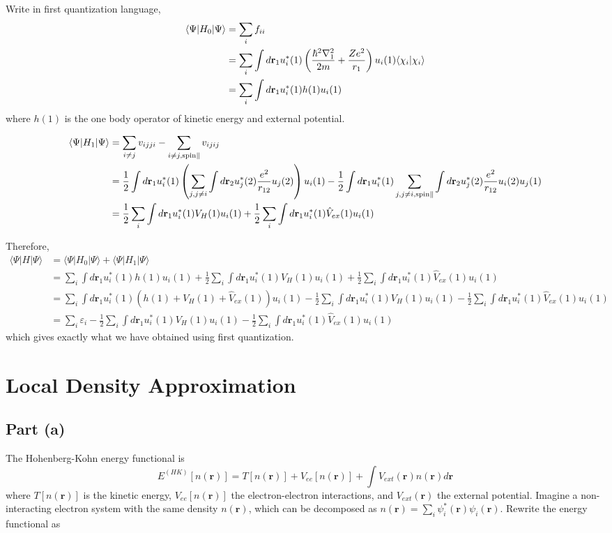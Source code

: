 \documentclass{article}
\begin{document}
Write in first quantization language,
\begin{align*}
\langle\Psi|H_0|\Psi\rangle&=\sum_if_{ii}\\
&=\sum_i\int d\mathbf{r}_1u_i^*(1)\left(\-\frac{\hbar^2\nabla_1^2}{2m}+\frac{Ze^2}{r_1}\right)u_i(1)\langle\chi_i|\chi_i\rangle\\
&=\sum_i\int d\mathbf{r}_1u_i^*(1)h(1)u_i(1)
\end{align*}
where $h(1)$ is the one body operator of kinetic energy and external potential.

\begin{align*}
\langle\Psi|H_1|\Psi\rangle&=\sum_{i\neq j}v_{ijji}-\sum_{i\neq j,\textup{spin}\parallel}v_{ijij}\\
&=\frac{1}{2}\int d\mathbf{r}_1u_i^*(1)\left(\sum_{j,j\neq i}\int d\mathbf{r}_2u_j^*(2)\frac{e^2}{r_{12}}u_j(2)\right)u_i(1)-\frac{1}{2}\int d\mathbf{r}_1u_i^*(1)\sum_{j,j\neq i,\textup{spin}\parallel}\int d\mathbf{r}_2u_j^*(2)\frac{e^2}{r_{12}}u_i(2)u_j(1)\\
&=\frac{1}{2}\sum_i\int d\mathbf{r}_1u_i^*(1)V_H(1)u_i(1)+\frac{1}{2}\sum_i\int d\mathbf{r}_1u_i^*(1)\hat{V}_{ex}(1)u_i(1)\\
\end{align*}

Therefore,
\begin{align*}
\langle\Psi|H|\Psi\rangle&=\langle\Psi|H_0|\Psi\rangle+\langle\Psi|H_1|\Psi\rangle\\
&=\sum_i\int d\mathbf{r}_ 1u_i^*(1)h(1)u_i(1)+\frac{1}{2}\sum_i\int d\mathbf{r}_1u_i^*(1)V_H(1)u_i(1)+\frac{1}{2}\sum_i\int d\mathbf{r}_1u_i^*(1)\hat{V}_{ex}(1)u_i(1)\\
&=\sum_i\int d\mathbf{r}_1u_i^*(1)(h(1)+V_H(1)+\hat{V}_{ex}(1))u_i(1)-\frac{1}{2}\sum_i\int d\mathbf{r}_1u_i^*(1)V_H(1)u_i(1)-\frac{1}{2}\sum_i\int d\mathbf{r}_1u_i^*(1)\hat{V}_{ex}(1)u_i(1)\\
&=\sum_i\varepsilon_i-\frac{1}{2}\sum_i\int d\mathbf{r}_1u_i^*(1)V_H(1)u_i(1)-\frac{1}{2}\sum_i\int d\mathbf{r}_1u_i^*(1)\hat{V}_{ex}(1)u_i(1)
\end{align*}
which gives exactly what we have obtained using first quantization.

\section{Local Density Approximation}
\subsection{Part (a)}
The Hohenberg-Kohn energy functional is
\begin{equation*}
E^{(H\!K)}[n(\mathbf{r})]=T[n(\mathbf{r})]+V_{ee}[n(\mathbf{r})]+\int V_{ext}(\mathbf{r})n(\mathbf{r})d\mathbf{r}
\end{equation*}
where $T[n(\mathbf{r})]$ is the kinetic energy, $V_{ee}[n(\mathbf{r})]$ the electron-electron interactions, and $V_{ext}(\mathbf{r})$ the external potential. Imagine a non-interacting electron system with the same density $n(\mathbf{r})$, which can be decomposed as $n(\mathbf{r})=\sum_i\psi_i^*(\mathbf{r})\psi_i(\mathbf{r})$. Rewrite the energy functional as
\end{document}
